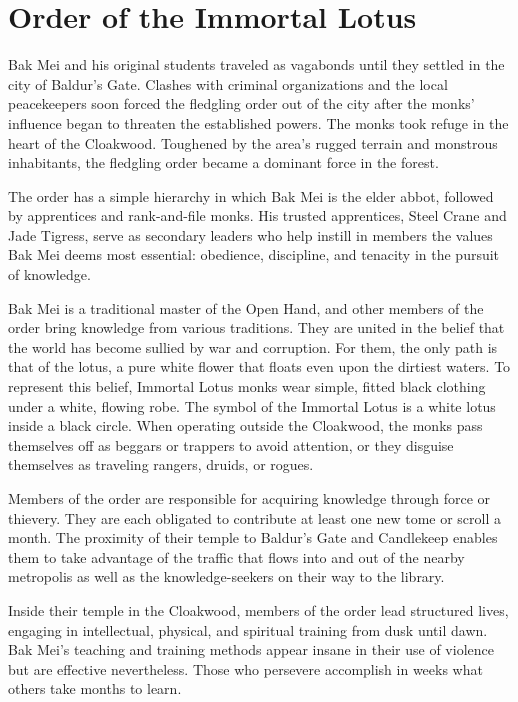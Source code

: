 \documentclass[10pt,a4paper,twoside,bg=print,twocolumn,openany,nodeprecatedcode]{dndbook}
\begin{document}
\section{Order of the Immortal Lotus}
Bak Mei and his original students traveled as vagabonds until they settled in the city of Baldur's Gate. Clashes with criminal organizations and the local peacekeepers soon forced the fledgling order out of the city after the monks' influence began to threaten the established powers. The monks took refuge in the heart of the Cloakwood. Toughened by the area's rugged terrain and monstrous inhabitants, the fledgling order became a dominant force in the forest.

The order has a simple hierarchy in which Bak Mei is the elder abbot, followed by apprentices and rank-and-file monks. His trusted apprentices, Steel Crane and Jade Tigress, serve as secondary leaders who help instill in members the values Bak Mei deems most essential: obedience, discipline, and tenacity in the pursuit of knowledge.

Bak Mei is a traditional master of the Open Hand, and other members of the order bring knowledge from various traditions. They are united in the belief that the world has become sullied by war and corruption. For them, the only path is that of the lotus, a pure white flower that floats even upon the dirtiest waters. To represent this belief, Immortal Lotus monks wear simple, fitted black clothing under a white, flowing robe. The symbol of the Immortal Lotus is a white lotus inside a black circle. When operating outside the Cloakwood, the monks pass themselves off as beggars or trappers to avoid attention, or they disguise themselves as traveling rangers, druids, or rogues.

Members of the order are responsible for acquiring knowledge through force or thievery. They are each obligated to contribute at least one new tome or scroll a month. The proximity of their temple to Baldur's Gate and Candlekeep enables them to take advantage of the traffic that flows into and out of the nearby metropolis as well as the knowledge-seekers on their way to the library.

Inside their temple in the Cloakwood, members of the order lead structured lives, engaging in intellectual, physical, and spiritual training from dusk until dawn. Bak Mei's teaching and training methods appear insane in their use of violence but are effective nevertheless. Those who persevere accomplish in weeks what others take months to learn.
\end{document}
